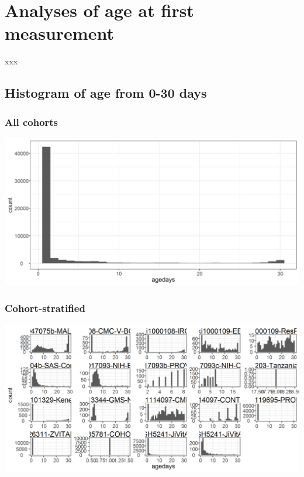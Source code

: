 \documentclass[9pt,]{book}
\begin{document}
\hypertarget{age-meas}{%
\chapter{Analyses of age at first measurement}\label{age-meas}}

\raggedright

xxx

\hypertarget{histogram-of-age-from-0-30-days}{%
\section{Histogram of age from 0-30 days}\label{histogram-of-age-from-0-30-days}}

\hypertarget{all-cohorts}{%
\subsection{All cohorts}\label{all-cohorts}}

\includegraphics[width=33.33in]{figure-copies/age_histogram_first_month}

\hypertarget{cohort-stratified}{%
\subsection{Cohort-stratified}\label{cohort-stratified}}

\includegraphics[width=33.33in]{figure-copies/age_histogram_first_month_cohort}
\end{document}
